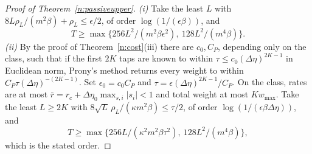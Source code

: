 \documentclass[11pt,letterpaper]{article}
\theoremstyle{definition}
\begin{document}
\begin{proof}[Proof of Theorem~\ref{n:passiveupper}]
\emph{(i)} Take the least $L$ with $8 L \rho_L / (m^2 \beta) + \rho_L \le \epsilon/2$, of order $\log(1/(\epsilon\beta))$, and
\[ T \ge \max\{256 L^2 / (m^2 \beta \epsilon^2),\ 128 L^2/(m^4\beta)\}. \]
\emph{(ii)} By the proof of Theorem~\ref{n:cost}(iii) there are $c_0, C_P$, depending only on the class, such that if the first $2K$ taps are known to within $\tau \le c_0 (\Delta\eta)^{2K-1}$ in Euclidean norm, Prony's method returns every weight to within $C_P \tau (\Delta\eta)^{-(2K-1)}$. Set $\epsilon_0 = c_0 C_P$ and $\tau = \epsilon (\Delta\eta)^{2K-1} / C_P$. On the class, rates are at most $\bar r = r_c + \Delta\eta_0 \max_{s,i} |s_i| < 1$ and total weight at most $K w_{\max}$. Take the least $L \ge 2K$ with $8\sqrt{L}\, \rho_L / (\kappa m^2 \beta) \le \tau/2$, of order $\log(1/(\epsilon\beta\Delta\eta))$, and
\[ T \ge \max\{256 L / (\kappa^2 m^2 \beta \tau^2),\ 128 L^2/(m^4\beta)\}, \]
which is the stated order.
\end{proof}
\end{document}
